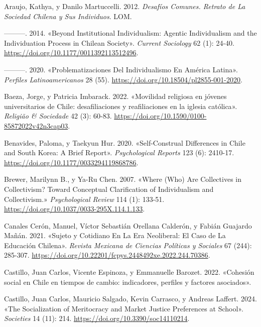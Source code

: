 \documentclass[
  letterpaper,
  DIV=11,
  numbers=noendperiod]{scrartcl}
\newlength{\cslhangindent}
\newenvironment{CSLReferences}[2] %
 {\begin{list}{}{%
  \setlength{\itemindent}{0pt}
  \setlength{\leftmargin}{0pt}
  \setlength{\parsep}{0pt}
  \ifodd #1
   \setlength{\leftmargin}{\cslhangindent}
   \setlength{\itemindent}{-1\cslhangindent}
  \fi
  \setlength{\itemsep}{#2\baselineskip}}}
 {\end{list}}
\begin{document}
\label{refs}
\begin{CSLReferences}{1}{0}
Araujo, Kathya, y Danilo Martuccelli. 2012. \emph{Desaf{í}os {Comunes}.
{Retrato} de La Sociedad Chilena y Sus Individuos}. LOM.

---------. 2014. {«Beyond Institutional Individualism: {Agentic}
Individualism and the Individuation Process in {Chilean} Society»}.
\emph{Current Sociology} 62 (1): 24-40.
\url{https://doi.org/10.1177/0011392113512496}.

---------. 2020. {«Problematizaciones Del Individualismo En {Am{é}rica
Latina}»}. \emph{Perfiles Latinoamericanos} 28 (55).
\url{https://doi.org/10.18504/pl2855-001-2020}.

Baeza, Jorge, y Patricia Imbarack. 2022. {«{Movilidad religiosa en
j{ó}venes universitarios de Chile: desafiliaciones y reafiliaciones en
la iglesia cat{ó}lica}»}. \emph{Religi{ã}o \& Sociedade} 42 (3): 60-83.
\url{https://doi.org/10.1590/0100-85872022v42n3cap03}.

Benavides, Paloma, y Taekyun Hur. 2020. {«Self-{Construal Differences}
in {Chile} and {South Korea}: {A Brief Report}»}. \emph{Psychological
Reports} 123 (6): 2410-17.
\url{https://doi.org/10.1177/0033294119868786}.

Brewer, Marilynn B., y Ya-Ru Chen. 2007. {«Where ({Who}) {Are
Collectives} in {Collectivism}? {Toward Conceptual Clarification} of
{Individualism} and {Collectivism}.»} \emph{Psychological Review} 114
(1): 133-51. \url{https://doi.org/10.1037/0033-295X.114.1.133}.

Canales Cerón, Manuel, Víctor Sebastián Orellana Calderón, y Fabián
Guajardo Mañán. 2021. {«Sujeto y Cotidiano En La Era Neoliberal: El Caso
de La Educaci{ó}n Chilena»}. \emph{Revista Mexicana de Ciencias
Pol{í}ticas y Sociales} 67 (244): 285-307.
\url{https://doi.org/10.22201/fcpys.2448492xe.2022.244.70386}.

Castillo, Juan Carlos, Vicente Espinoza, y Emmanuelle Barozet. 2022.
{«{Cohesi{ó}n social en Chile en tiempos de cambio: indicadores,
perfiles y factores asociados}»}.

Castillo, Juan Carlos, Mauricio Salgado, Kevin Carrasco, y Andreas
Laffert. 2024. {«The {Socialization} of {Meritocracy} and {Market
Justice Preferences} at {School}»}. \emph{Societies} 14 (11): 214.
\url{https://doi.org/10.3390/soc14110214}.


\end{CSLReferences}
\end{document}
